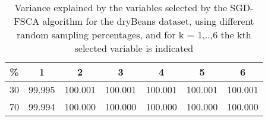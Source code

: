 \begin{table}
	\begin{center}
		\begin{tabular}{c c c c c c c}
			\% & 1 & 2 & 3 & 4 & 5 & 6 \\
			\hline
			30 & 99.995 & 100.001 & 100.001 & 100.001 & 100.001 & 100.001 \\
			70 & 99.994 & 100.000 & 100.000 & 100.000 & 100.000 & 100.000 \\
		\end{tabular}
	\end{center}
	\caption{Variance explained by the variables selected by the SGD-FSCA algorithm for the dryBeans dataset, using different random sampling percentages, and for k = 1,..,6 the kth selected variable is indicated}
\end{table}